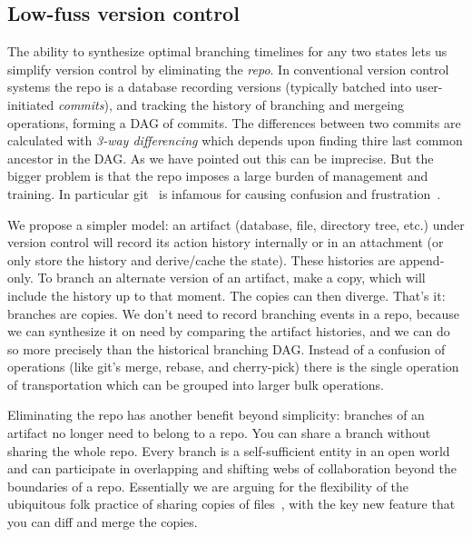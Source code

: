 \documentclass[english,submission]{programming}
\theoremstyle{definition}
\begin{document}
\subsection{Low-fuss version control}

The ability to synthesize optimal branching timelines for any two states lets us simplify version control by eliminating the \textit{repo}. In conventional version control systems the repo is a database recording versions (typically batched into user-initiated \textit{commits}), and tracking the history of branching and mergeing operations, forming a DAG of commits. The differences between two commits are calculated with \textit{3-way differencing} which depends upon finding thire last common ancestor in the DAG. As we have pointed out this can be imprecise. But the bigger problem is that the repo imposes a large burden of management and training. In particular git~\cite{ProGit} is infamous for causing confusion and frustration~\cite{perez13, church2014case}.

We propose a simpler model: an artifact (database, file, directory tree, etc.) under version control will record its action history internally or in an attachment (or only store the history and derive/cache the state). These histories are append-only. To branch an alternate version of an artifact, make a copy, which will include the history up to that moment. The copies can then diverge. That's it: branches are copies. We don't need to record branching events in a repo, because we can synthesize it on need by comparing the artifact histories, and we can do so more precisely than the historical branching DAG.
Instead of a confusion of operations (like git's merge, rebase, and cherry-pick) there is the single operation of transportation which can be grouped into larger bulk operations.

Eliminating the repo has another benefit beyond simplicity: branches of an artifact no longer need to belong to a repo. You can share a branch without sharing the whole repo. Every branch is a self-sufficient entity in an open world and can participate in overlapping and shifting webs of collaboration beyond the boundaries of a repo. Essentially we are arguing for the flexibility of the ubiquitous folk practice of sharing copies of files~\cite{Burnett14, Basman19}, with the key new feature that you can diff and merge the copies.

\end{document}
